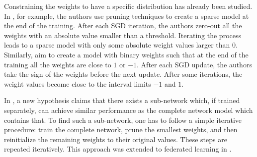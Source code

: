 \documentclass[accepted]{uai2021} %
\begin{document}
Constraining the weights to have a specific distribution has already been studied. In \cite{dsd}, for example, the authors use pruning techniques to create a sparse model at the end of the training. After each SGD iteration, the authors zero-out all the weights with an absolute value smaller than a threshold. Iterating the process leads to a sparse model with only some absolute weight values larger than 0. Similarly, \cite{Joshua_binary} aim to create a model with binary weights such that at the end of the training all the weights are close to $1$ or $-1$. After each SGD update, the authors take the sign of the weights before the next update. After some iterations, the weight values become close to the interval limits $-1$ and $1$.

In \cite{lottery_ticket}, a new hypothesis claims that there exists a sub-network which, if trained separately, can achieve similar performance as the complete network model which contains that. To find such a sub-network, one has to follow a simple iterative procedure: train the complete network, prune the smallest weights, and then reinitialize the remaining weights to their original values. These steps are repeated iteratively. This approach was extended to federated learning in \cite{li2020lotteryfl}.




\end{document}
